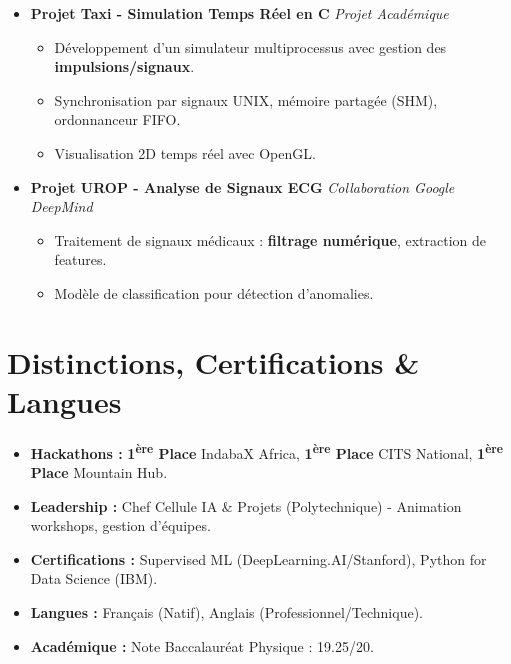 \documentclass[a4paper,11pt]{article}
\begin{document}
\begin{itemize}[leftmargin=*, label={}]
\item \textbf{Projet Taxi - Simulation Temps Réel en C} \hfill \textit{Projet Académique}
\vspace{-2pt}
    \begin{itemize}[leftmargin=0.4cm, nosep, label=\tiny$\bullet$]
        \item \small{Développement d'un simulateur multiprocessus avec gestion des \textbf{impulsions/signaux}.}
        \item \small{Synchronisation par signaux UNIX, mémoire partagée (SHM), ordonnanceur FIFO.}
        \item \small{Visualisation 2D temps réel avec OpenGL.}
    \end{itemize}
    \vspace{3pt}

\item \textbf{Projet UROP - Analyse de Signaux ECG} \hfill \textit{Collaboration Google DeepMind}
\vspace{-2pt}
    \begin{itemize}[leftmargin=0.4cm, nosep, label=\tiny$\bullet$]
        \item \small{Traitement de signaux médicaux : \textbf{filtrage numérique}, extraction de features.}
        \item \small{Modèle de classification pour détection d'anomalies.}
    \end{itemize}

\end{itemize}

\section{Distinctions, Certifications \& Langues}
\begin{itemize}[leftmargin=*, nosep]
    \item \textbf{Hackathons :} \textbf{1\textsuperscript{ère} Place} IndabaX Africa, \textbf{1\textsuperscript{ère} Place} CITS National, \textbf{1\textsuperscript{ère} Place} Mountain Hub.
    \item \textbf{Leadership :} Chef Cellule IA \& Projets (Polytechnique) - Animation workshops, gestion d'équipes.
    \item \textbf{Certifications :} Supervised ML (DeepLearning.AI/Stanford), Python for Data Science (IBM).
    \item \textbf{Langues :} Français (Natif), Anglais (Professionnel/Technique).
    \item \textbf{Académique :} Note Baccalauréat Physique : 19.25/20.
\end{itemize}
\end{document}
